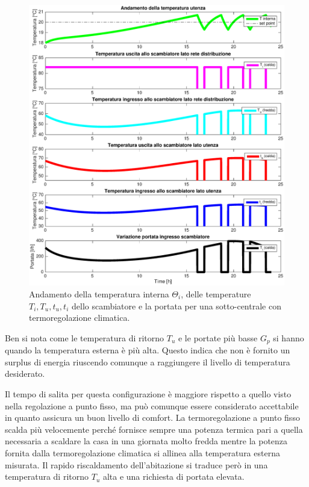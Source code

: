 \documentclass[laurea,oneside,11pt]{USiena_tesiLM3}
\begin{document}
\begin{figure}[!ht]
\centering
\includegraphics[width=\textwidth]{figure/reg_climatica} 
\caption{Andamento della temperatura interna $\Theta_i$, delle temperature $T_i, T_u, t_u, t_i$ dello scambiatore e la portata per una sotto-centrale con termoregolazione climatica.}
\label{fig:reg_climatica}
\end{figure}

Ben si nota come le temperatura di ritorno $T_u$ e le portate più basse  $G_p$ si hanno quando la temperatura esterna è più alta. Questo indica che non è fornito un surplus di energia riuscendo comunque a raggiungere il livello di temperatura desiderato.

Il tempo di salita per questa configurazione è maggiore rispetto a quello visto nella regolazione a punto fisso, ma può comunque essere considerato accettabile in quanto assicura un buon livello di comfort. La termoregolazione a punto fisso scalda più velocemente perché fornisce sempre una potenza termica pari a quella necessaria a scaldare la casa in una giornata molto fredda mentre la potenza fornita dalla termoregolazione climatica si allinea alla temperatura esterna misurata. Il rapido riscaldamento dell'abitazione si traduce però in una temperatura di ritorno $T_u$ alta e una richiesta di portata elevata. 
\end{document}
